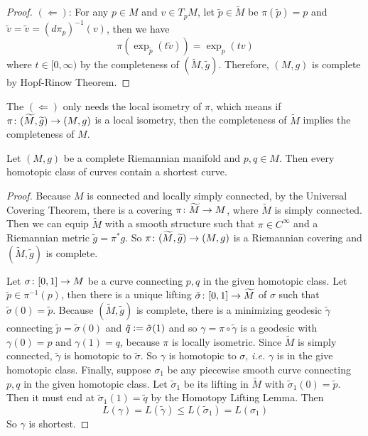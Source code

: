 \begin{enumerate}[label=\arabic{*}.]
\begin{proof}
		\noindent $(\Leftarrow)$: For any $p \in M$ and $v \in T_pM$, let $\tilde{p} \in \widetilde{M}$ be $\pi(\tilde{p}) = p$ and $\tilde{v} = \tilde{v} = (d\pi_p)^{-1}(v)$, then we have
		\begin{equation*}
			\pi(\exp_{\tilde{p}}(t\tilde{v})) = \exp_{p}(tv)
		\end{equation*}
		where $t \in [0,\infty)$ by the completeness of $(\widetilde{M},\widetilde{g})$. Therefore, $(M,g)$ is complete by Hopf-Rinow Theorem.
	\end{proof}
	\begin{rmk}
		The $(\Leftarrow)$ only needs the local isometry of $\pi$, which means if $\pi \colon (\widetilde{M},\widetilde{g}) \rightarrow (M,g)$ is a local isometry, then the completeness of $\widetilde{M}$ implies the completeness of $M$.
	\end{rmk}
	
	\begin{thm}
		Let $(M,g)$ be a complete Riemannian manifold and $p,q \in M$. Then every homotopic class of curves contain a shortest curve.
	\end{thm}
	\begin{proof}
		Because $M$ is connected and locally simply connected, by the Universal Covering Theorem, there is a covering $\pi \colon \widetilde{M} \rightarrow M$, where $\widetilde{M}$ is simply connected. Then we can equip $\widetilde{M}$ with a smooth structure such that $\pi \in C^\infty$ and a Riemannian metric $\widetilde{g} = \pi^*g$. So $\pi \colon (\widetilde{M},\widetilde{g}) \rightarrow (M,g)$ is a Riemannian covering and $(\widetilde{M},\widetilde{g})$ is complete. 

		\noindent Let $\sigma \colon [0,1] \rightarrow M$ be a curve connecting $p,q$ in the given homotopic class. Let $\tilde{p} \in \pi^{-1}(p)$, then there is a unique lifting $\tilde{\sigma} \colon [0,1] \rightarrow \widetilde{M}$ of $\sigma$ such that $\tilde{\sigma}(0) = \tilde{p}$. Because $(\widetilde{M},\widetilde{g})$ is complete, there is a minimizing geodesic $\tilde{\gamma}$ connecting $\tilde{p} = \tilde{\sigma}(0)$ and $\tilde{q} \vcentcolon= \tilde{\sigma}(1)$ and so $\gamma = \pi \circ \tilde{\gamma}$ is a geodesic with $\gamma(0) = p$ and $\gamma(1)=q$, because $\pi$ is locally isometric. Since $\widetilde{M}$ is simply connected, $\tilde{\gamma}$ is homotopic to $\tilde{\sigma}$. So $\gamma$ is homotopic to $\sigma$, \emph{i.e.} $\gamma$ is in the give homotopic class. Finally, suppose $\sigma_1$ be any piecewise smooth curve connecting $p,q$ in the given homotopic class. Let $\tilde{\sigma}_1$ be its lifting in $\widetilde{M}$ with $\tilde{\sigma}_1(0) = \tilde{p}$. Then it must end at $\tilde{\sigma}_1(1) = \tilde{q}$ by the Homotopy Lifting Lemma. Then
		\begin{equation*}
			L(\gamma) = L(\tilde{\gamma}) \leq L(\tilde{\sigma}_1) = L(\sigma_1)
		\end{equation*}
		So $\gamma$ is shortest.
	\end{proof}


\end{enumerate}
